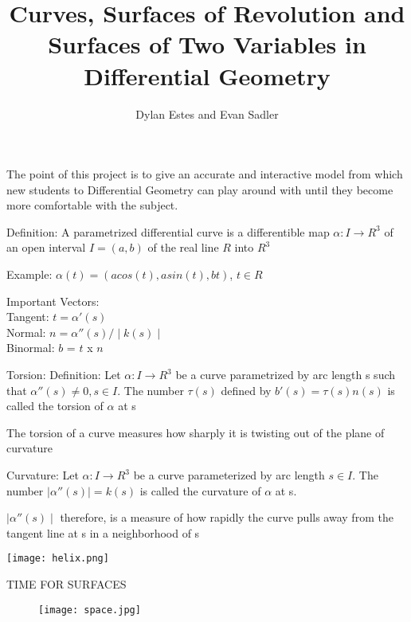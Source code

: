 \documentclass{beamer}
\title{Curves, Surfaces of Revolution and Surfaces of Two Variables in Differential Geometry}
\author{Dylan Estes and Evan Sadler}\institute{University of Washington}
\begin{document}
\begin{frame}
\titlepage

\end{frame}

\begin{frame}
The point of this project is to give an accurate and interactive model from which new students to Differential Geometry can play around with until they become more comfortable with the subject.
\end{frame}

\begin{frame}
Definition: A parametrized differential curve is a differentible map $\alpha: I \rightarrow R^3$ of an open interval $I = (a,b)$ of the real line $R$ into $R^3$

Example: $\alpha(t) = (acos(t),asin(t),bt)$,  $t\in R$
\end{frame}

\begin{frame}
Important Vectors:\\
Tangent: $t = \alpha'(s)$\\
Normal: $n = \alpha''(s)/\mid k(s)\mid$\\
Binormal: $b$ = $t$ x $n$
\end{frame}


\begin{frame}
Torsion: 
Definition: Let $\alpha:I \rightarrow R^3$ be a curve parametrized by arc length s such that $\alpha''(s) \neq 0, s \in I$. The number $\tau (s)$ defined by $ b'(s) = \tau (s)n(s)$ is called the torsion of $\alpha$ at s

The torsion of a curve measures how sharply it is twisting out of the plane of curvature
\end{frame}

\begin{frame}
Curvature:
Let $\alpha:I \rightarrow R^3$ be a curve parameterized by arc length $s \in I$. The number $\mid \alpha''(s)\mid = k(s)$ is called the curvature of $\alpha$ at s.

$\mid \alpha''(s)\mid$ therefore, is a measure of how rapidly the curve pulls away from the tangent line at s in a neighborhood of s
\end{frame}

\begin{frame}
\texttt{[image: helix.png]}
\end{frame}

\begin{frame}[t]
\begin{center}
\Huge TIME FOR SURFACES
\end{center}

\begin{figure}[ht!]
\centering
\texttt{[image: space.jpg]}
\caption{}
\label{overflow}
\end{figure}
\end{frame}
\end{document}
